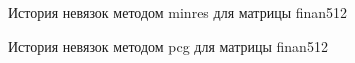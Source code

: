\begin{figure}[H]
    \renewcommand{\figurename}{Рисунок}
    \caption{История невязок методом minres для матрицы finan512}
    \label{fig:image_39}
\end{figure}

\begin{figure}[H]
    \renewcommand{\figurename}{Рисунок}
    \caption{История невязок методом pcg для матрицы finan512}
    \label{fig:image_40}
\end{figure}

